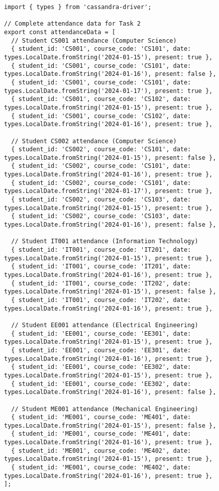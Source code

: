 \begin{verbatim}
import { types } from 'cassandra-driver';

// Complete attendance data for Task 2
export const attendanceData = [
  // Student CS001 attendance (Computer Science)
  { student_id: 'CS001', course_code: 'CS101', date: types.LocalDate.fromString('2024-01-15'), present: true },
  { student_id: 'CS001', course_code: 'CS101', date: types.LocalDate.fromString('2024-01-16'), present: false },
  { student_id: 'CS001', course_code: 'CS101', date: types.LocalDate.fromString('2024-01-17'), present: true },
  { student_id: 'CS001', course_code: 'CS102', date: types.LocalDate.fromString('2024-01-15'), present: true },
  { student_id: 'CS001', course_code: 'CS102', date: types.LocalDate.fromString('2024-01-16'), present: true },

  // Student CS002 attendance (Computer Science)
  { student_id: 'CS002', course_code: 'CS101', date: types.LocalDate.fromString('2024-01-15'), present: false },
  { student_id: 'CS002', course_code: 'CS101', date: types.LocalDate.fromString('2024-01-16'), present: true },
  { student_id: 'CS002', course_code: 'CS101', date: types.LocalDate.fromString('2024-01-17'), present: true },
  { student_id: 'CS002', course_code: 'CS103', date: types.LocalDate.fromString('2024-01-15'), present: true },
  { student_id: 'CS002', course_code: 'CS103', date: types.LocalDate.fromString('2024-01-16'), present: false },

  // Student IT001 attendance (Information Technology)
  { student_id: 'IT001', course_code: 'IT201', date: types.LocalDate.fromString('2024-01-15'), present: true },
  { student_id: 'IT001', course_code: 'IT201', date: types.LocalDate.fromString('2024-01-16'), present: true },
  { student_id: 'IT001', course_code: 'IT202', date: types.LocalDate.fromString('2024-01-15'), present: false },
  { student_id: 'IT001', course_code: 'IT202', date: types.LocalDate.fromString('2024-01-16'), present: true },

  // Student EE001 attendance (Electrical Engineering)
  { student_id: 'EE001', course_code: 'EE301', date: types.LocalDate.fromString('2024-01-15'), present: true },
  { student_id: 'EE001', course_code: 'EE301', date: types.LocalDate.fromString('2024-01-16'), present: true },
  { student_id: 'EE001', course_code: 'EE302', date: types.LocalDate.fromString('2024-01-15'), present: true },
  { student_id: 'EE001', course_code: 'EE302', date: types.LocalDate.fromString('2024-01-16'), present: false },

  // Student ME001 attendance (Mechanical Engineering)
  { student_id: 'ME001', course_code: 'ME401', date: types.LocalDate.fromString('2024-01-15'), present: false },
  { student_id: 'ME001', course_code: 'ME401', date: types.LocalDate.fromString('2024-01-16'), present: true },
  { student_id: 'ME001', course_code: 'ME402', date: types.LocalDate.fromString('2024-01-15'), present: true },
  { student_id: 'ME001', course_code: 'ME402', date: types.LocalDate.fromString('2024-01-16'), present: true },
];
\end{verbatim}

